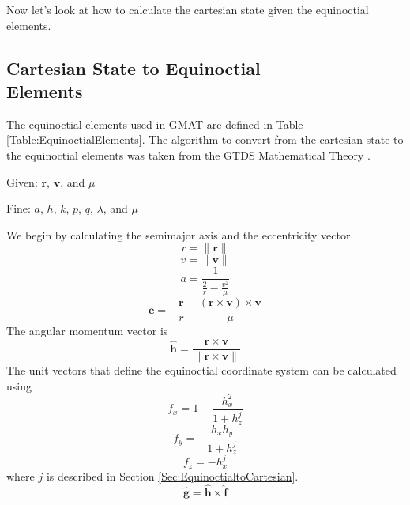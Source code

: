 Now let's look at how to calculate the cartesian state given the
equinoctial elements.

\subsection{Cartesian State to Equinoctial \\ Elements}  
\label{Sec:CartesiantoEquinoctial}

The equinoctial elements used in GMAT are defined in Table
\ref{Table:EquinoctialElements}.  The algorithm to convert from
the cartesian state to the equinoctial elements was taken from the
GTDS Mathematical Theory \cite{GTDS}.

\noindent Given:  $\mathbf{r}$, $\mathbf{v}$, and $\mu$

\noindent Fine:  $a$, $h$, $k$, $p$, $q$, $\lambda$, and $\mu$

We begin by calculating the semimajor axis and the eccentricity
vector.
%
\begin{equation}
    r = \| \mathbf{r} \|
\end{equation}
%
\begin{equation}
    v = \| \mathbf{v} \|
\end{equation}
%
\begin{equation}
     a = \displaystyle\frac{1}{\displaystyle\frac{2}{r} - \displaystyle\frac{v^2}{\mu}}
\end{equation}
%
\begin{equation}
     \mathbf{e} = -\frac{ \mathbf{r} }{r} - \frac{\left( \mathbf{r} \times \mathbf{v} \right) \times \mathbf{v}}{\mu}
\end{equation}
%
The angular momentum vector is
%
\begin{equation}
   \hat{\mathbf{h}} = \frac{\mathbf{r} \times \mathbf{v} }{ \| \mathbf{r} \times \mathbf{v} \|}
\end{equation}
%
The unit vectors that define the equinoctial coordinate system can
be calculated using
%
\begin{equation}
   f_x = 1 - \frac{h_x^2}{ 1 + h_z^j}
\end{equation}
%
\begin{equation}
   f_y = -\frac{h_x h_y}{ 1 + h_z^j}
\end{equation}
%
\begin{equation}
   f_z = -h_x^j
\end{equation}
%
where $j$ is described in Section \ref{Sec:EquinoctialtoCartesian}.\\
%
\begin{equation}
    \hat{\mathbf{g}} = \hat{\mathbf{h}} \times \hat{\mathbf{f}}
\end{equation}
%

